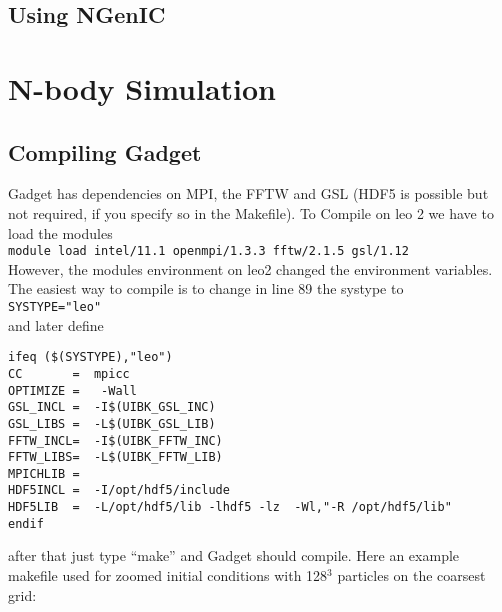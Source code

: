 \documentclass[a4paper,english,10.5pt]{scrartcl}
\begin{document}
\subsection{Using NGenIC}

\section{N-body Simulation}

\subsection{Compiling Gadget}
Gadget has dependencies on MPI, the FFTW and GSL (HDF5 is possible but not required, if you specify so in the Makefile). To Compile on leo 2 we have to load the modules\\
\texttt{module load intel/11.1 openmpi/1.3.3 fftw/2.1.5   gsl/1.12}\\
However, the modules environment on leo2 changed the environment variables. The easiest way to compile is to change in line 89 the systype to\\
\texttt{SYSTYPE="leo"}\\
and later define
\begin{verbatim}
ifeq ($(SYSTYPE),"leo")
CC       =  mpicc   
OPTIMIZE =   -Wall 
GSL_INCL =  -I$(UIBK_GSL_INC)
GSL_LIBS =  -L$(UIBK_GSL_LIB) 
FFTW_INCL=  -I$(UIBK_FFTW_INC)
FFTW_LIBS=  -L$(UIBK_FFTW_LIB)
MPICHLIB =
HDF5INCL =  -I/opt/hdf5/include
HDF5LIB  =  -L/opt/hdf5/lib -lhdf5 -lz  -Wl,"-R /opt/hdf5/lib"
endif
\end{verbatim}
after that just type ``make'' and Gadget should compile. Here an example makefile used for zoomed initial conditions with 128$^3$ particles on the coarsest grid:
\end{document}
